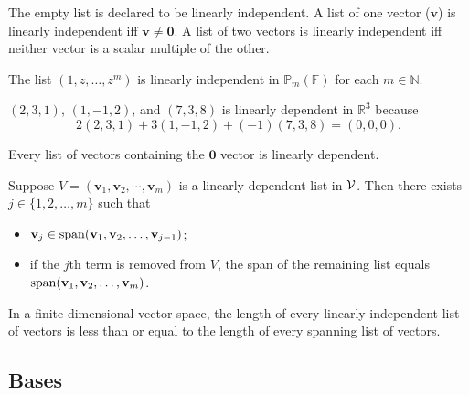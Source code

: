 \begin{exm}
  The empty list is declared to be linearly independent.
  A list of one vector ($\mathbf{v}$) is linearly independent
  iff $\mathbf{v}\ne \mathbf{0}$.
  A list of two vectors is linearly independent iff neither vector
  is a scalar multiple of the other.
\end{exm}

\begin{exm}
  The list $(1,z,\ldots,z^m)$ is linearly independent in 
  $\mathbb{P}_{m}(\mathbb{F})$ for each $m\in \mathbb{N}$.
\end{exm}

\begin{exm}
  $(2,3,1)$, $(1,-1,2)$, and $(7,3,8)$ is linearly dependent in
  $\mathbb{R}^3$
  because
  \begin{equation*}
    2(2,3,1)+3(1,-1,2)+(-1)(7,3,8)=(0,0,0).
  \end{equation*}
\end{exm}

\begin{exm}
  Every list of vectors containing the $\mathbf{0}$ vector
  is linearly dependent.
\end{exm}

\begin{lem}
  \label{lem:linearDependence}
  Suppose \mbox{$V=(\mathbf{v}_1,\mathbf{v}_2,\cdots,\mathbf{v}_m)$}
  is a linearly dependent list in ${\cal V}$.
  Then there exists $j\in \{1,2,\ldots,m\}$ such that
  \begin{itemize}\itemsep0em
  \item $\mathbf{v}_j\in \mathrm{span}(\mathbf{v}_1,\mathbf{v}_2,\ldots,\mathbf{v}_{j-1})$;
  \item if the $j$th term is removed from $V$,
    the span of the remaining list equals $\mathrm{span}(\mathbf{v}_1,\mathbf{v}_2,\ldots,\mathbf{v}_{m})$.
  \end{itemize}
\end{lem}

\begin{lem}
  \label{lem:lengthOfIndependentAndSpanningLists}
  In a finite-dimensional vector space, the length
  of every linearly independent list of vectors
  is less than or equal to the length of every
  spanning list of vectors.
\end{lem}


\subsection{Bases}
\label{sec:bases}

